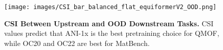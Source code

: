 \begin{figure}
\centering
\texttt{[image: images/CSI\_bar\_balanced\_flat\_equiformerV2\_OOD.png]}
\vspace{-0.2cm}
\caption{\textbf{CSI Between Upstream and OOD Downstream Tasks.} CSI values predict that ANI-1x is the best pretraining choice for QMOF, while OC20 and OC22 are best for MatBench.}
\label{fig:CSI_OOD}
\vspace{-0.30cm}
\end{figure}